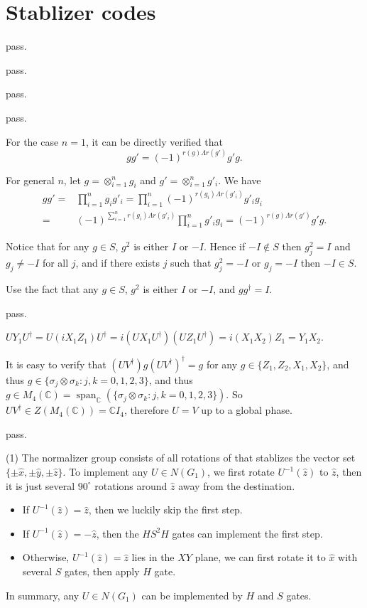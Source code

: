 \section{Stablizer codes}

\ex pass.

\ex pass.

\ex pass.

\ex pass.

\ex For the case $n=1$, it can be directly verified that
$$gg'=(-1)^{r(g)\Lambda r(g')}g'g.$$

For general $n$, let $g=\otimes_{i=1}^ng_i$ and $g'=\otimes_{i=1}^ng'_i$.
We have
$$\begin{aligned}
gg' = & \prod_{i=1}^n g_ig'_i
= \prod_{i=1}^n (-1)^{r(g_i)\Lambda r(g'_i)} g'_ig_i
\\ = & (-1)^{\sum_{i=1}^n r(g_i)\Lambda r(g'_i)} \prod_{i=1}^n g'_ig_i
= (-1)^{r(g)\Lambda r(g')} g'g.
\end{aligned}$$

\ex Notice that for any $g\in S$, $g^2$ is either $I$ or $-I$.
Hence if $-I\notin S$ then $g_j^2=I$ and $g_j\neq -I$ for all $j$, and if there exists $j$ such that $g_j^2=-I$ or $g_j=-I$ then $-I\in S$.

\ex Use the fact that any $g\in S$, $g^2$ is either $I$ or $-I$, and $gg^\dagger=I$.

\ex pass.

\ex $UY_1U^\dagger = U(iX_1Z_1)U^\dagger = i(UX_1U^\dagger)(UZ_1U^\dagger) = i(X_1X_2)Z_1 = Y_1X_2$.

\ex It is easy to verify that $(UV^\dagger)g(UV^\dagger)^\dagger=g$ for any $g\in\{Z_1,Z_2,X_1,X_2\}$, and thus $g\in\{\sigma_j\otimes\sigma_k:j,k=0,1,2,3\}$, and thus $g\in M_4(\mathbb{C}) = \operatorname{span}_{\mathbb{C}}(\{\sigma_j\otimes\sigma_k:j,k=0,1,2,3\})$.
So $UV^\dagger\in Z(M_4(\mathbb{C})) = \mathbb{C}I_4$, therefore $U=V$ up to a global phase.

\ex pass.

\ex (1) The normalizer group consists of all rotations of that stablizes the vector set $\{\pm\hat{x},\pm\hat{y},\pm\hat{z}\}$.
To implement any $U\in N(G_1)$, we first rotate $U^{-1}(\hat{z})$ to $\hat{z}$, then it is just several $90^\circ$ rotations around $\hat{z}$ away from the destination.
\begin{itemize}
    \item If $U^{-1}(\hat{z})=\hat{z}$, then we luckily skip the first step.
    \item If $U^{-1}(\hat{z})=-\hat{z}$, then the $HS^2H$ gates can implement the first step.
    \item Otherwise, $U^{-1}(\hat{z})=\hat{z}$ lies in the $XY$ plane, we can first rotate it to $\hat{x}$ with several $S$ gates, then apply $H$ gate.
\end{itemize}
In summary, any $U\in N(G_1)$ can be implemented by $H$ and $S$ gates.

